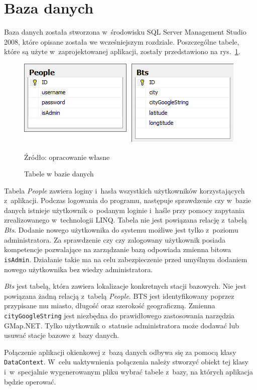 \documentclass[12pt,a4paper]{report}
\begin{document}
\section{Baza danych}
Baza danych została stworzona w~środowisku SQL Server Management Studio 2008, które opisane została we wcześniejszym rozdziale. Poszczególne tabele, które są użyte w~zaprojektowanej aplikacji, zostały przedstawiono na rys.~\ref{fig: Database}.

\begin{figure}[!bht]
\centering
\includegraphics[scale=1]{Pictures/Database.png}
\label{fig: Database}
\caption{Tabele w bazie danych}{Źródło: opracowanie własne}
\end{figure}

Tabela \textit{People} zawiera loginy i~hasła wszystkich użytkowników korzystających z~aplikacji. Podczas logowania do programu, następuje sprawdzenie czy w~bazie danych istnieje użytkownik o~podanym loginie i~haśle przy pomocy zapytania zrealizowanego w~technologii LINQ. Tabela nie jest powiązana relację z~tabelą \textit{Bts}. Dodanie nowego użytkownika do systemu możliwe jest tylko z~poziomu administratora. Za sprawdzenie czy czy zalogowany użytkownik posiada kompetencje pozwalające na zarządzanie bazą odpowiada zmienna bitowa \verb+isAdmin+. Działanie takie ma na celu zabezpieczenie przed umyślnym dodaniem nowego użytkownika bez wiedzy administratora.

\textit{Bts} jest tabelą, która zawiera lokalizacje konkretnych stacji bazowych. Nie jest powiązana żadną relacją z~tabelą \textit{People}. BTS jest identyfikowany poprzez przypisane mu miasto, długość oraz szerokość geograficzną. Zmienna \verb+cityGoogleString+ jest niezbędna do prawidłowego zastosowania narzędzia GMap.NET. Tylko użytkownik o~statusie administratora może dodawać lub usuwać stacje bazowe z~bazy danych.

Połączenie aplikacji okienkowej z~bazą danych odbywa się za pomocą klasy \verb+DataContext+. W~celu uaktywnienia połączenia należy stworzyć obiekt tej klasy i~w~specjalnie wygenerowanym pliku wybrać tabele z~bazy, na których aplikacja będzie operować. 
\end{document}
